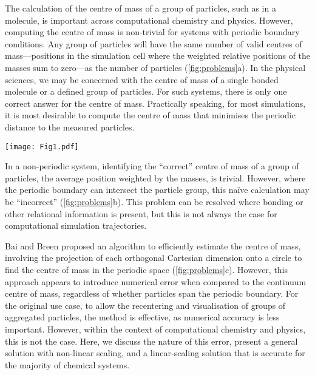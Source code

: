 \documentclass[reprint,superscriptaddress,nobibnotes,amsmath,amssymb,aip]{revtex4-2}
\begin{document}
The calculation of the centre of mass of a group of particles, such as in a molecule, is important across computational chemistry and physics.\cite{zhang_chemically_2024,happel_coordinated_2024,maggi_universality_2021,grillo_molecular_2023,bullerjahn_unwrapping_2023,jaeger-honz_systematic_2024}
However, computing the centre of mass is non-trivial for systems with periodic boundary conditions. 
Any group of particles will have the same number of valid centres of mass---positions in the simulation cell where the weighted relative positions of the masses sum to zero---as the number of particles (\cref{fig:problems}a). 
In the physical sciences, we may be concerned with the centre of mass of a single bonded molecule or a defined group of particles.
For such systems, there is only one correct answer for the centre of mass.
Practically speaking, for most simulations, it is most desirable to compute the centre of mass that minimises the periodic distance to the measured particles.
%
\begin{figure*}
  \texttt{[image: Fig1.pdf]}
  \caption{
  (a) Demonstration of the $N$ possible centres of mass in an $N$ particle system, where two periodic cells are visible, and the dashed line indicates the particle grouping that leads to a given centre of mass (cross). 
  (b) The problem with the naïve centre of mass (red cross) calculation in periodic systems, where the particle group spans a periodic boundary. 
  (c) The projection of the particles in the bottom diagram of (b) onto a circle to find the centre of mass (yellow cross), which minimises the weighted distance to all particles on the planar disk of the circle.}
  \label{fig:problems}
\end{figure*}
%

In a non-periodic system, identifying the ``correct'' centre of mass of a group of particles, the average position weighted by the masses, is trivial. 
However, where the periodic boundary can intersect the particle group, this naïve calculation may be ``incorrect'' (\cref{fig:problems}b). 
This problem can be resolved where bonding or other relational information is present, but this is not always the case for computational simulation trajectories. 

Bai and Breen proposed an algorithm to efficiently estimate the centre of mass,\cite{bai_calculating_2008} involving the projection of each orthogonal Cartesian dimension onto a circle to find the centre of mass in the periodic space (\cref{fig:problems}c). 
However, this approach appears to introduce numerical error when compared to the continuum centre of mass, regardless of whether particles span the periodic boundary. 
For the original use case, to allow the recentering and visualisation of groups of aggregated particles, the method is effective, as numerical accuracy is less important. 
However, within the context of computational chemistry and physics, this is not the case.  
Here, we discuss the nature of this error, present a general solution with non-linear scaling, and a linear-scaling solution that is accurate for the majority of chemical systems.
\end{document}
